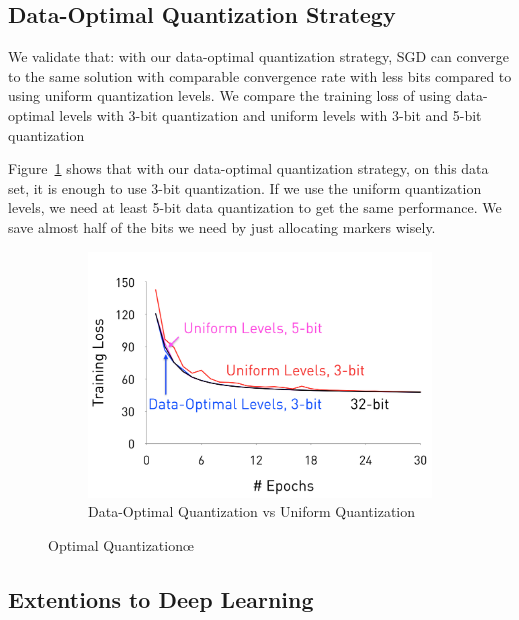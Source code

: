 \documentclass{article}
\begin{document}
\subsection{Data-Optimal Quantization Strategy}
We validate that: with our data-optimal quantization strategy, 
SGD can converge to the same solution with comparable convergence rate with less bits 
compared to using uniform quantization levels. We compare the training loss of using data-optimal levels with 3-bit quantization and uniform levels with 3-bit and 5-bit quantization


Figure~\ref{fig:optimal_lr} shows that with our data-optimal quantization strategy, on this data set, it is enough to use 3-bit quantization. If we use the uniform quantization levels, we need at least 5-bit data quantization to get the same performance. We save almost half of the bits we need by just allocating markers wisely.

\begin{figure}[h]
\centering
    \begin{subfigure}[h]{.4\columnwidth}
    \includegraphics[width=\columnwidth]{final-experiments/OptimalQuantization} 
    \caption{Data-Optimal Quantization vs Uniform Quantization}
    \label{fig:optimal_lr}
    \end{subfigure}
    \begin{subfigure}[h]{.4\columnwidth}
    \label{fig:optimal_dl}
    \end{subfigure}
\label{fig:optimal}
\caption{Optimal Quantizationœ}
\end{figure}
\subsection{Extentions to Deep Learning}
\end{document}
